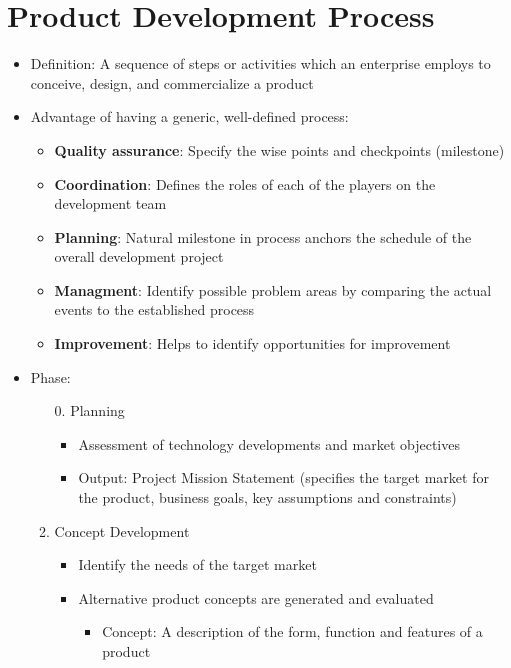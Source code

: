 \documentclass[openany,12pt,a4paper]{book}
\begin{document}
\section{Product Development Process}
\begin{itemize}
    \item Definition: A sequence of steps or activities which an enterprise employs to conceive, design, and commercialize a product
    \item Advantage of having a generic, well-defined process:
    \begin{itemize}
        \item \textbf{Quality assurance}: Specify the wise points and checkpoints (milestone)
        \item \textbf{Coordination}: Defines the roles of each of the players on the development team
        \item \textbf{Planning}: Natural milestone in process anchors the schedule of the overall development project
        \item \textbf{Managment}: Identify possible problem areas by comparing the actual events to the established process
        \item \textbf{Improvement}: Helps to identify opportunities for improvement
    \end{itemize}
    \item Phase:
    \begin{enumerate}
        \item[0.] Planning
        \begin{itemize}
            \item Assessment of technology developments and market objectives
            \item Output: Project Mission Statement (specifies the target market for the product, business goals, key assumptions and constraints)
        \end{itemize}
        \item Concept Development
        \begin{itemize}
            \item Identify the needs of the target market
            \item Alternative product concepts are generated and evaluated
            \begin{itemize}
                \item Concept: A description of the form, function and features of a product
            \end{itemize}

\end{itemize}
\end{enumerate}
\end{itemize}
\end{document}
